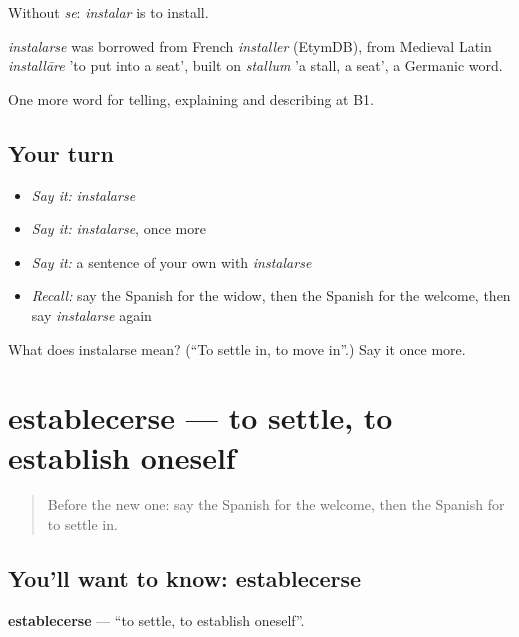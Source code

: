 Without \emph{se}: \emph{instalar} is to install.

\begin{cousinweb}
\emph{instalarse} was borrowed from French \emph{installer} (EtymDB), from Medieval Latin \emph{installāre} 'to put into a seat', built on \emph{stallum} 'a stall, a seat', a Germanic word.
\end{cousinweb}

\begin{grammarlens}[title={What you've built}]
One more word for telling, explaining and describing at B1.
\end{grammarlens}

\subsection*{Your turn}
\begin{itemize}
\raggedright
  \item \emph{Say it:} \emph{instalarse}
  \item \emph{Say it:} \emph{instalarse}, once more
  \item \emph{Say it:} a sentence of your own with \emph{instalarse}
  \item \emph{Recall:} say the Spanish for the widow, then the Spanish for the welcome, then say \emph{instalarse} again
\end{itemize}

\begin{tcolorbox}[breakable,colback=teal!4,colframe=teal!35!black,title={Before you move on}]
What does instalarse mean? (\textquotedblleft{}To settle in, to move in\textquotedblright{}.) Say it once more.
\end{tcolorbox}
\section[establecerse]{establecerse — to settle, to establish oneself}

\label{lesson:ES-C551-establecerse}



\begin{quote}
Before the new one: say the Spanish for the welcome, then the Spanish for to settle in.
\end{quote}

\subsection*{You'll want to know: establecerse}
\textbf{establecerse} — \textquotedblleft{}to settle, to establish oneself\textquotedblright{}.

